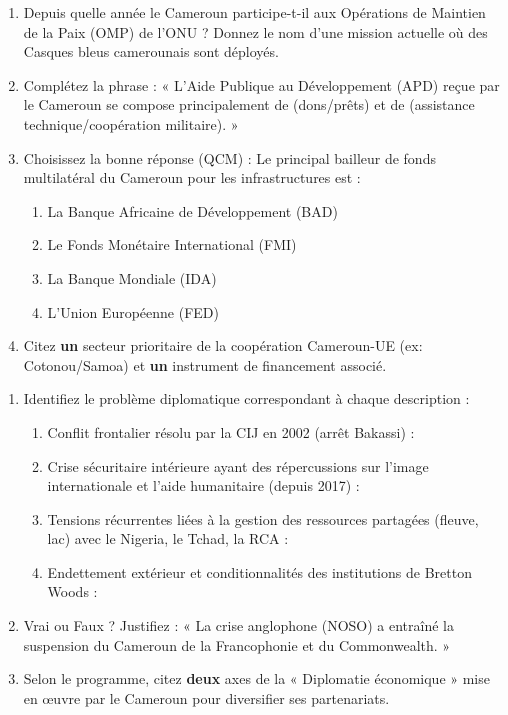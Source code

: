 \documentclass[11pt]{article}
\begin{document}
\begin{exercice}
\begin{enumerate}
    \item Depuis quelle année le Cameroun participe-t-il aux Opérations de Maintien de la Paix (OMP) de l'ONU ? Donnez le nom d'une mission actuelle où des Casques bleus camerounais sont déployés.
    \item Complétez la phrase : « L'Aide Publique au Développement (APD) reçue par le Cameroun se compose principalement de \underline{\hspace{3cm}} (dons/prêts) et de \underline{\hspace{3cm}} (assistance technique/coopération militaire). »
    \item Choisissez la bonne réponse (QCM) : Le principal bailleur de fonds multilatéral du Cameroun pour les infrastructures est :
    \begin{enumerate}
        \item La Banque Africaine de Développement (BAD)
        \item Le Fonds Monétaire International (FMI)
        \item La Banque Mondiale (IDA)
        \item L'Union Européenne (FED)
    \end{enumerate}
    \item Citez \textbf{un} secteur prioritaire de la coopération Cameroun-UE (ex: Cotonou/Samoa) et \textbf{un} instrument de financement associé.
\end{enumerate}
\end{exercice}

\begin{exercice}
\begin{enumerate}
    \item Identifiez le problème diplomatique correspondant à chaque description :
    \begin{enumerate}
        \item Conflit frontalier résolu par la CIJ en 2002 (arrêt Bakassi) :
        \item Crise sécuritaire intérieure ayant des répercussions sur l'image internationale et l'aide humanitaire (depuis 2017) :
        \item Tensions récurrentes liées à la gestion des ressources partagées (fleuve, lac) avec le Nigeria, le Tchad, la RCA :
        \item Endettement extérieur et conditionnalités des institutions de Bretton Woods :
    \end{enumerate}
    \item Vrai ou Faux ? Justifiez : « La crise anglophone (NOSO) a entraîné la suspension du Cameroun de la Francophonie et du Commonwealth. »
    \item Selon le programme, citez \textbf{deux} axes de la « Diplomatie économique » mise en œuvre par le Cameroun pour diversifier ses partenariats.
\end{enumerate}
\end{exercice}
\end{document}
